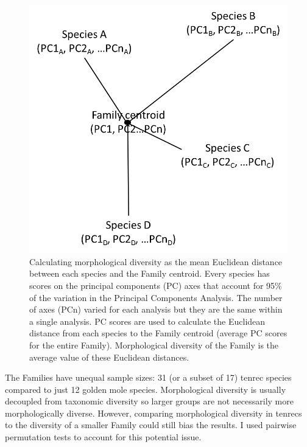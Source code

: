 	\begin{figure}[!htbp]
	\centering
	\includegraphics [width=0.7\linewidth, height=0.7\textheight, keepaspectratio]{Disparity/writing/figures/Centroids.png}
	\caption[Calculating diversity as mean Euclidean distance to Family centroid.]
		{Calculating morphological diversity as the mean Euclidean distance between each species and the Family centroid. Every species has scores on the principal components (PC) axes that account for 95\% of the variation in the Principal Components Analysis. The number of axes (PCn) varied for each analysis but they are the same within a single analysis. PC scores are used to calculate the Euclidean distance from each species to the Family centroid (average PC scores for the entire Family). Morphological diversity of the Family is the average value of these Euclidean distances.}
	\label{fig:centroids}
	\end{figure}
	

	
	The Families have unequal sample sizes: 31 (or a subset of 17) tenrec species compared to just 12 golden mole species. Morphological diversity is usually decoupled from taxonomic diversity \citep[e.g.][]{Ruta2013, Hopkins2013} so larger groups are not necessarily more morphologically diverse. However, comparing morphological diversity in tenrecs to the diversity of a smaller Family could still bias the results. I used pairwise permutation tests to account for this potential issue. 


